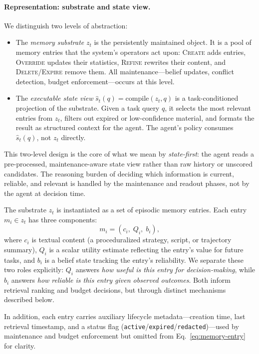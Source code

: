 \paragraph{Representation: substrate and state view.}
We distinguish two levels of abstraction:
\begin{itemize}
  \item The \emph{memory substrate} $z_t$ is the persistently maintained object. It is a pool of memory entries that the system's operators act upon: \textsc{Create} adds entries, \textsc{Override} updates their statistics, \textsc{Refine} rewrites their content, and \textsc{Delete}/\textsc{Expire} remove them. All maintenance---belief updates, conflict detection, budget enforcement---occurs at this level.
  \item The \emph{executable state view} $\hat{s}_t(q) = \mathrm{compile}(z_t, q)$ is a task-conditioned projection of the substrate. Given a task query $q$, it selects the most relevant entries from $z_t$, filters out expired or low-confidence material, and formats the result as structured context for the agent. The agent's policy consumes $\hat{s}_t(q)$, not $z_t$ directly.
\end{itemize}
This two-level design is the core of what we mean by \emph{state-first}: the agent reads a pre-processed, maintenance-aware state view rather than raw history or unscored candidates. The reasoning burden of deciding which information is current, reliable, and relevant is handled by the maintenance and readout phases, not by the agent at decision time.

The substrate $z_t$ is instantiated as a set of episodic memory entries. Each entry $m_i \in z_t$ has three components:
\begin{equation}
\label{eq:memory-entry}
  m_i = (c_i,\; Q_i,\; b_i),
\end{equation}
where $c_i$ is textual content (a proceduralized strategy, script, or trajectory summary), $Q_i$ is a scalar utility estimate reflecting the entry's value for future tasks, and $b_i$ is a belief state tracking the entry's reliability. We separate these two roles explicitly: $Q_i$ answers \emph{how useful is this entry for decision-making}, while $b_i$ answers \emph{how reliable is this entry given observed outcomes}. Both inform retrieval ranking and budget decisions, but through distinct mechanisms described below.

In addition, each entry carries auxiliary lifecycle metadata---creation time, last retrieval timestamp, and a status flag (\texttt{active}/\texttt{expired}/\texttt{redacted})---used by maintenance and budget enforcement but omitted from Eq.~\ref{eq:memory-entry} for clarity.

